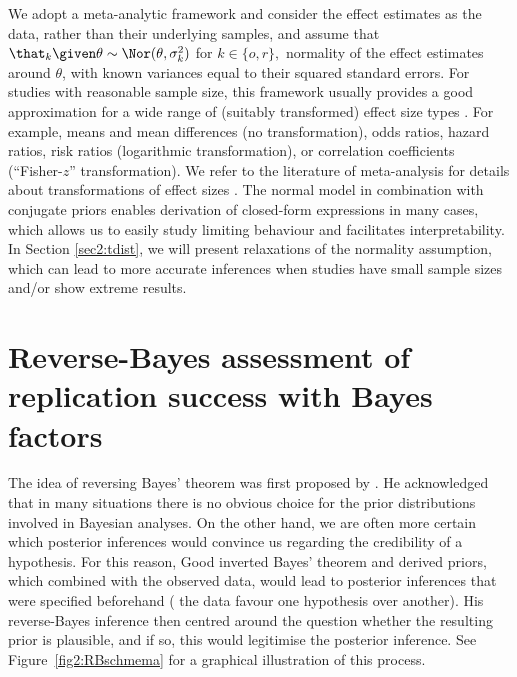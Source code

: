 We adopt a meta-analytic framework and consider the effect estimates as the
data, rather than their underlying samples, and assume that
$\that_k \given \theta \sim \Nor(\theta, \sigma^2_k)$ for $k \in \{o, r\},$ \ie{}
normality of the effect estimates around $\theta$, with known variances equal to
their squared standard errors. For studies with reasonable sample size, this
framework usually provides a good approximation for a wide range of (suitably
transformed) effect size types \citep[Chapter 2.4]{Spiegelhalter2004}. For
example, means and mean differences (no transformation), odds ratios, hazard
ratios, risk ratios (logarithmic transformation), or correlation coefficients
(``Fisher-$z$'' transformation). We refer to the literature of meta-analysis for
details about transformations of effect sizes \citep[\eg{}][Chapter
11.6]{Cooper2019}. The normal model in combination with conjugate priors enables
derivation of closed-form expressions in many cases, which allows us to easily
study limiting behaviour and facilitates interpretability. In Section
\ref{sec2:tdist}, we will present relaxations of the normality assumption, which
can lead to more accurate inferences when studies have small sample sizes and/or
show extreme results.


\section{Reverse-Bayes assessment of replication success with Bayes factors}
\label{sec2:methods}
The idea of reversing Bayes' theorem was first proposed by \citet{Good1950}. He
acknowledged that in many situations there is no obvious choice for the prior
distributions involved in Bayesian analyses. On the other hand, we are often
more certain which posterior inferences would convince us regarding the
credibility of a hypothesis. For this reason, Good inverted Bayes' theorem and
derived priors, which combined with the observed data, would lead to posterior
inferences that were specified beforehand (\eg{} the data favour one hypothesis
over another). His reverse-Bayes inference then centred around the question
whether the resulting prior is plausible, and if so, this would legitimise the
posterior inference. See Figure~\ref{fig2:RBschmema} for a graphical illustration
of this process.

